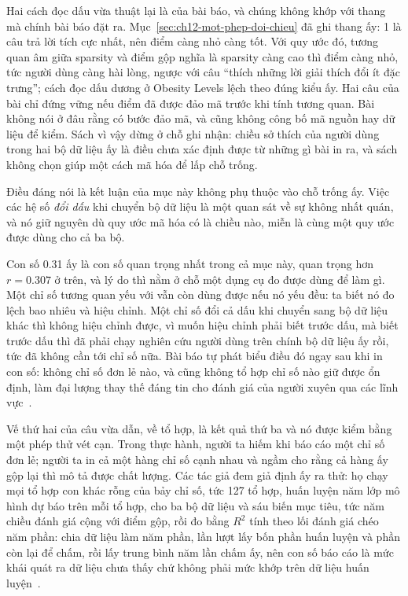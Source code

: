 Hai cách đọc dấu vừa thuật lại là của bài báo, và chúng không khớp với thang mà
chính bài báo đặt ra. Mục~\ref{sec:ch12-mot-phep-doi-chieu} đã ghi thang ấy: 1
là câu trả lời tích cực nhất, nên điểm càng nhỏ càng tốt. Với quy ước đó, tương
quan âm giữa sparsity và điểm gộp nghĩa là sparsity càng cao thì điểm càng nhỏ,
tức người dùng càng hài lòng, ngược với câu \enquote{thích những lời giải thích
đổi ít đặc trưng}; cách đọc dấu dương ở Obesity Levels lệch theo đúng kiểu ấy.
Hai câu của bài chỉ đứng vững nếu điểm đã được đảo mã trước khi tính tương quan.
Bài không nói ở đâu rằng có bước đảo mã, và cũng không công bố mã nguồn hay dữ
liệu để kiểm. Sách vì vậy dừng ở chỗ ghi nhận: chiều sở thích của người dùng
trong hai bộ dữ liệu ấy là điều chưa xác định được từ những gì bài in ra, và
sách không chọn giúp một cách mã hóa để lấp chỗ trống.

Điều đáng nói là kết luận của mục này không phụ thuộc vào chỗ trống ấy. Việc các
hệ số \emph{đổi dấu} khi chuyển bộ dữ liệu là một quan sát về sự không nhất
quán, và nó giữ nguyên dù quy ước mã hóa có là chiều nào, miễn là cùng một quy
ước được dùng cho cả ba bộ.

Con số 0.31 ấy là con số quan trọng nhất trong cả mục này, quan trọng hơn
$r = 0.307$ ở trên, và lý do thì nằm ở chỗ một dụng cụ đo được dùng để làm gì.
Một chỉ số tương quan yếu với 
vẫn còn dùng được nếu nó yếu
đều: ta biết nó đo lệch bao nhiêu và hiệu chỉnh. Một chỉ số đổi cả dấu khi
chuyển sang bộ dữ liệu khác thì không hiệu chỉnh được, vì muốn hiệu chỉnh phải
biết trước dấu, mà biết trước dấu thì đã phải chạy nghiên cứu người dùng trên
chính bộ dữ liệu ấy rồi, tức đã không cần tới chỉ số nữa. Bài báo tự phát biểu
điều đó ngay sau khi in con số: không chỉ số đơn lẻ nào, và cũng không tổ hợp
chỉ số nào giữ được ổn định, làm đại lượng thay thế đáng tin cho đánh giá của
người xuyên qua các lĩnh vực~\autocite{p25userperception}.

%
Vế thứ hai của câu vừa dẫn, về tổ hợp, là kết quả thứ ba và nó được kiểm bằng
một phép thử vét cạn. Trong thực hành, người ta hiếm khi báo cáo một chỉ số
đơn lẻ; người ta in cả một hàng chỉ số cạnh nhau và ngầm cho rằng cả hàng ấy
gộp lại thì mô tả được chất lượng. Các tác giả đem giả định ấy ra thử: họ chạy
mọi tổ hợp con khác rỗng của bảy chỉ số, tức 127 tổ hợp, huấn luyện năm lớp mô
hình dự báo trên mỗi tổ hợp, cho ba bộ dữ liệu và sáu biến mục tiêu, tức năm
chiều đánh giá cộng với điểm gộp, rồi đo bằng $R^2$ tính theo lối đánh giá
chéo năm phần: chia dữ liệu làm năm phần, lần lượt lấy bốn phần huấn luyện và
phần còn lại để chấm, rồi lấy trung bình năm lần chấm ấy, nên con số báo cáo
là mức khái quát ra dữ liệu chưa thấy chứ không phải mức khớp trên dữ liệu
huấn luyện~\autocite{p25userperception}.

